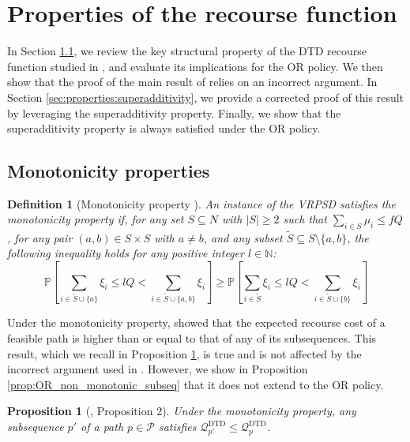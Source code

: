 \documentclass{article}
\newtheorem{proposition}{Proposition}
\newtheorem{definition}{Definition}
\newcommand{\rev}[1]{{\color{black}#1}}
\begin{document}
\section{Properties of the recourse function}\label{sec:properties}
In Section \ref{sec:properties:monotonicity}, we review the key structural property of the DTD recourse function studied in \cite{parada2024disaggregated}, and evaluate its implications for the OR policy. We then show that the proof of the main result of \cite{parada2024disaggregated} relies on an incorrect argument. In Section \ref{sec:properties:superadditivity}, we provide a corrected proof of this result by leveraging the superadditivity property. Finally, we show that the superadditivity property is always satisfied under the OR policy.

\subsection{Monotonicity properties}\label{sec:properties:monotonicity}
\begin{definition}[Monotonicity property \cite{parada2024disaggregated}]\label{def:mono_prop_parada}
    An instance of the VRPSD satisfies the monotonicity property if, for any set $S \subseteq N$ with $|S| \geq 2$ such that $\sum_{i \in S}\mu_i \leq fQ$, for any pair $(a,b) \in S\times S$ with $a\neq b$, and any subset $\widetilde{S} \subseteq S \setminus \{a,b\}$, the following inequality holds for any positive integer $l \in \mathbb{N}$:
    \begin{equation}\label{ineq:mono_prop}
        \mathbb{P}\left[\sum_{i \in \widetilde{S} \cup \{a\} } \xi_i \leq lQ < \sum_{i \in \widetilde{S} \cup \{a,b\} } \xi_i \right] \geq \mathbb{P}\left[\sum_{i \in \widetilde{S} } \xi_i \leq lQ < \sum_{i \in \widetilde{S} \cup \{b\} } \xi_i \right]
    \end{equation}
\end{definition}

Under the monotonicity property, \cite{parada2024disaggregated} showed that the expected recourse cost of a feasible path is higher than or equal to that of any of its subsequences. \rev{This result, which we recall in Proposition \ref{prop:DTD_monotonic_subseq}, is true and is not affected by the incorrect argument used in \cite{parada2024disaggregated}}. However, we show in Proposition \ref{prop:OR_non_monotonic_subseq} that it does not extend to the OR policy.

\begin{proposition}[\cite{parada2024disaggregated}, Proposition 2] \label{prop:DTD_monotonic_subseq} Under the monotonicity property, any subsequence $p'$ of a path $p \in \mathcal{P}$ satisfies $\mathcal{Q}^{\text{DTD}}_{p'} \leq \mathcal{Q}^{\text{DTD}}_{p}$.
\end{proposition}
\end{document}
